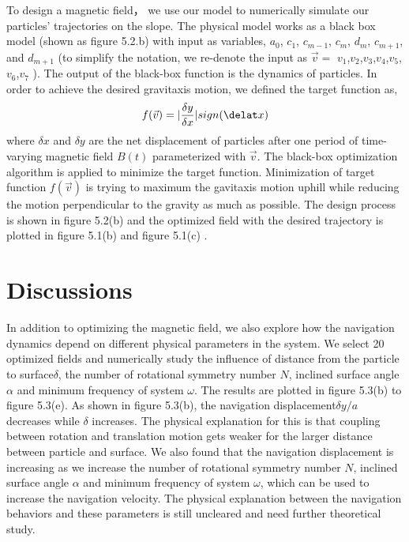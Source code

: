 To design a magnetic field， we use our model to numerically simulate our particles' trajectories on the slope. The physical model works as a black box model (shown as figure 5.2.b) with input as variables, $a_0$, $c_1$, $c_{m-1}$, $c_{m}$, $d_{m}$, $c_{m+1}$, and $d_{m+1}$ (to simplify the notation, we re-denote the input as $\vec{v}=$ $v_1$,$v_2$,$v_3$,$v_4$,$v_5$,$v_6$,$v_7$  ). The output of the black-box function is the dynamics of particles. In order to achieve the desired gravitaxis motion, we defined the target function as,
\begin{equation}
    f(\vec{v})=|\frac{\delta y}{\delta x}| sign(\delat x)
\end{equation}
where $\delta x$ and $\delta y$ are the net displacement of particles after one period of  time-varying magnetic field $B(t)$ parameterized with $\vec{v}$.
The black-box optimization algorithm is applied to minimize the target function\autocite{dou2019autonomous}. Minimization of target function $f(\vec{v})$ is trying to maximum the gavitaxis motion uphill while reducing the motion perpendicular to the gravity as much as possible. The design process is shown in figure 5.2(b) and the optimized field with the desired trajectory is plotted in figure 5.1(b) and figure 5.1(c) .


 
\section{Discussions}
In addition to optimizing the magnetic field, we also explore how the navigation dynamics depend on different physical parameters in the system. We select 20 optimized fields and numerically study the influence of distance from the particle to surface$\delta$, the number of  rotational symmetry number $N$, inclined surface angle $\alpha$ and  minimum frequency of system  $\omega$. The results are plotted in figure 5.3(b) to figure 5.3(e). As shown in figure 5.3(b), the navigation displacement$\delta y/a$ decreases while $\delta$ increases. The physical explanation for this is that coupling between rotation and translation motion gets weaker for the larger distance between particle and surface. We also found that the navigation displacement is increasing as we increase the   number of  rotational symmetry number $N$, inclined surface angle $\alpha$ and  minimum frequency of system  $\omega$, which can be used to increase the navigation velocity. The physical explanation between the navigation behaviors and these parameters is still uncleared and need further theoretical study. 



